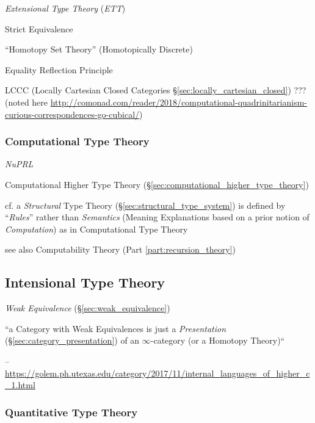 \emph{Extensional Type Theory} (\emph{ETT})

Strict Equivalence

``Homotopy Set Theory'' (Homotopically Discrete)

Equality Reflection Principle

LCCC (Locally Cartesian Closed Categories \S\ref{sec:locally_cartesian_closed})
??? (noted here
\url{http://comonad.com/reader/2018/computational-quadrinitarianism-curious-correspondences-go-cubical/})



\subsubsection{Computational Type Theory}\label{sec:computational_type}

\emph{NuPRL}

\fist Computational Higher Type Theory
(\S\ref{sec:computational_higher_type_theory})

cf. a \emph{Structural} Type Theory (\S\ref{sec:structural_type_system}) is
defined by ``\emph{Rules}'' rather than \emph{Semantics} (Meaning Explanations
based on a prior notion of \emph{Computation}) as in Computational Type Theory

\fist see also Computability Theory (Part \ref{part:recursion_theory})



\subsection{Intensional Type Theory}\label{sec:intensional_type}
\cite{harper12}

\emph{Weak Equivalence} (\S\ref{sec:weak_equivalence})

``a Category with Weak Equivalences is just a \emph{Presentation}
(\S\ref{sec:category_presentation}) of an $\infty$-category (or a Homotopy
Theory)``

--\url{https://golem.ph.utexas.edu/category/2017/11/internal_languages_of_higher_c_1.html}



\subsubsection{Quantitative Type Theory}\label{sec:quantitative_type}

